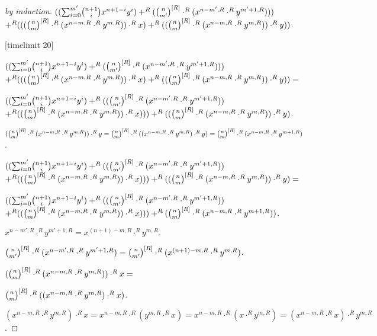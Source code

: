\documentclass[11pt]{article}
\begin{document}
\begin{forthel}
\begin{proof}[by induction]
$ ((\binsum{m'}{n+1}{x}{y}{R}) +^{R} (\cho{n}{m'}^{[R]} \cdot^{R} (x^{n-m',R} \cdot^{R} y^{m'+1,R}))) $
$ +^{R} 
(((\cho{n}{m}^{[R]} \cdot^{R} (x^{n - m,R} \cdot^{R} y^{m,R})) \cdot^{R} x)
   +^{R} ((\cho{n}{m}^{[R]} \cdot^{R} (x^{n - m,R} \cdot^{R} y^{m,R})) \cdot^{R} y)) $.

[timelimit 20]

$ ((\binsum{m'}{n+1}{x}{y}{R}) +^{R} (\cho{n}{m'}^{[R]} \cdot^{R} (x^{n-m',R} \cdot^{R} y^{m'+1,R}))) $
$ +^{R} 
(((\cho{n}{m}^{[R]} \cdot^{R} (x^{n - m,R} \cdot^{R} y^{m,R})) \cdot^{R} x)
   +^{R} ((\cho{n}{m}^{[R]} \cdot^{R} (x^{n - m,R} \cdot^{R} y^{m,R})) \cdot^{R} y)) =$

$ ((\binsum{m'}{n+1}{x}{y}{R}) +^{R} ((\cho{n}{m'}^{[R]} \cdot^{R} (x^{n-m',R} \cdot^{R} y^{m'+1,R})) $
$ +^{R} 
((\cho{n}{m}^{[R]} \cdot^{R} (x^{n - m,R} \cdot^{R} y^{m,R})) \cdot^{R} x)))
   +^{R} ((\cho{n}{m}^{[R]} \cdot^{R} (x^{n - m,R} \cdot^{R} y^{m,R})) \cdot^{R} y) $.

$(\cho{n}{m}^{[R]} \cdot^{R} (x^{n - m,R} \cdot^{R} y^{m,R})) \cdot^{R} y =
\cho{n}{m}^{[R]} \cdot^{R} ((x^{n - m,R} \cdot^{R} y^{m,R}) \cdot^{R} y) =
\cho{n}{m}^{[R]} \cdot^{R} (x^{n - m,R} \cdot^{R} y^{m+1,R})$.


$ ((\binsum{m'}{n+1}{x}{y}{R}) +^{R} ((\cho{n}{m'}^{[R]} \cdot^{R} (x^{n-m',R} \cdot^{R} y^{m'+1,R})) $
$ +^{R} 
((\cho{n}{m}^{[R]} \cdot^{R} (x^{n - m,R} \cdot^{R} y^{m,R})) \cdot^{R} x)))
   +^{R} ((\cho{n}{m}^{[R]} \cdot^{R} (x^{n - m,R} \cdot^{R} y^{m,R})) \cdot^{R} y) =$

$ ((\binsum{m'}{n+1}{x}{y}{R}) +^{R} ((\cho{n}{m'}^{[R]} \cdot^{R} (x^{n-m',R} \cdot^{R} y^{m'+1,R})) $
$ +^{R} 
((\cho{n}{m}^{[R]} \cdot^{R} (x^{n - m,R} \cdot^{R} y^{m,R})) \cdot^{R} x)))
   +^{R} (\cho{n}{m}^{[R]} \cdot^{R} (x^{n - m,R} \cdot^{R} y^{m+1,R})) $.

$x^{n-m',R} \cdot^{R} y^{m'+1,R} = x^{(n+1)-m,R} \cdot^{R} y^{m,R}.$

$\cho{n}{m'}^{[R]} \cdot^{R} (x^{n-m',R} \cdot^{R} y^{m'+1,R}) = 
\cho{n}{m'}^{[R]} \cdot^{R} (x^{(n+1)-m,R} \cdot^{R} y^{m,R})$.

$(\cho{n}{m}^{[R]} \cdot^{R} (x^{n - m,R} \cdot^{R} y^{m,R})) \cdot^{R} x = $

$\cho{n}{m}^{[R]} \cdot^{R} ((x^{n - m,R} \cdot^{R} y^{m,R}) \cdot^{R} x)$.

$(x^{n - m,R} \cdot^{R} y^{m,R}) \cdot^{R} x = 
x^{n - m,R} \cdot^{R} (y^{m,R} \cdot^{R} x) =
x^{n - m,R} \cdot^{R} (x \cdot^{R} y^{m,R}) =
(x^{n - m,R} \cdot^{R} x) \cdot^{R} y^{m,R}$.


\end{proof}
\end{forthel}
\end{document}
